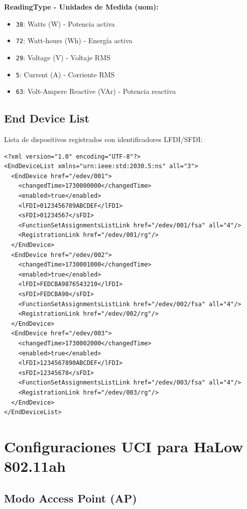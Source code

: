 \textbf{ReadingType - Unidades de Medida (uom):}
\begin{itemize}
    \item \texttt{38}: Watts (W) - Potencia activa
    \item \texttt{72}: Watt-hours (Wh) - Energía activa
    \item \texttt{29}: Voltage (V) - Voltaje RMS
    \item \texttt{5}: Current (A) - Corriente RMS
    \item \texttt{63}: Volt-Ampere Reactive (VAr) - Potencia reactiva
\end{itemize}

\subsection{End Device List}

Lista de dispositivos registrados con identificadores LFDI/SFDI:

\begin{verbatim}
<?xml version="1.0" encoding="UTF-8"?>
<EndDeviceList xmlns="urn:ieee:std:2030.5:ns" all="3">
  <EndDevice href="/edev/001">
    <changedTime>1730000000</changedTime>
    <enabled>true</enabled>
    <lFDI>0123456789ABCDEF</lFDI>
    <sFDI>01234567</sFDI>
    <FunctionSetAssignmentsListLink href="/edev/001/fsa" all="4"/>
    <RegistrationLink href="/edev/001/rg"/>
  </EndDevice>
  <EndDevice href="/edev/002">
    <changedTime>1730001000</changedTime>
    <enabled>true</enabled>
    <lFDI>FEDCBA9876543210</lFDI>
    <sFDI>FEDCBA98</sFDI>
    <FunctionSetAssignmentsListLink href="/edev/002/fsa" all="4"/>
    <RegistrationLink href="/edev/002/rg"/>
  </EndDevice>
  <EndDevice href="/edev/003">
    <changedTime>1730002000</changedTime>
    <enabled>true</enabled>
    <lFDI>1234567890ABCDEF</lFDI>
    <sFDI>12345678</sFDI>
    <FunctionSetAssignmentsListLink href="/edev/003/fsa" all="4"/>
    <RegistrationLink href="/edev/003/rg"/>
  </EndDevice>
</EndDeviceList>
\end{verbatim}

\section{Configuraciones UCI para HaLow 802.11ah}

\subsection{Modo Access Point (AP)}

